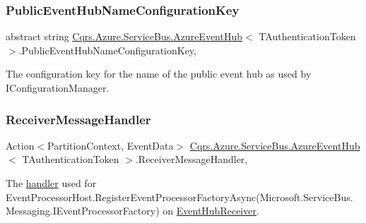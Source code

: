 \subsubsection{\texorpdfstring{Public\+Event\+Hub\+Name\+Configuration\+Key}{PublicEventHubNameConfigurationKey}}
{\footnotesize\ttfamily abstract string \hyperlink{classCqrs_1_1Azure_1_1ServiceBus_1_1AzureEventHub}{Cqrs.\+Azure.\+Service\+Bus.\+Azure\+Event\+Hub}$<$ T\+Authentication\+Token $>$.Public\+Event\+Hub\+Name\+Configuration\+Key\hspace{0.3cm}{\ttfamily [get]}, {\ttfamily [protected]}}



The configuration key for the name of the public event hub as used by I\+Configuration\+Manager. 

\mbox{\label{classCqrs_1_1Azure_1_1ServiceBus_1_1AzureEventHub_a8c9faa7096d72a45803e6e63a1b3cf30_a8c9faa7096d72a45803e6e63a1b3cf30}} 
\subsubsection{\texorpdfstring{Receiver\+Message\+Handler}{ReceiverMessageHandler}}
{\footnotesize\ttfamily Action$<$Partition\+Context, Event\+Data$>$ \hyperlink{classCqrs_1_1Azure_1_1ServiceBus_1_1AzureEventHub}{Cqrs.\+Azure.\+Service\+Bus.\+Azure\+Event\+Hub}$<$ T\+Authentication\+Token $>$.Receiver\+Message\+Handler\hspace{0.3cm}{\ttfamily [get]}, {\ttfamily [protected]}}



The \hyperlink{}{handler} used for Event\+Processor\+Host.\+Register\+Event\+Processor\+Factory\+Async(\+Microsoft.\+Service\+Bus.\+Messaging.\+I\+Event\+Processor\+Factory) on \hyperlink{classCqrs_1_1Azure_1_1ServiceBus_1_1AzureEventHub_a1b12b47dbb9b9afe2014477a2e457c35_a1b12b47dbb9b9afe2014477a2e457c35}{Event\+Hub\+Receiver}. 

\mbox{\label{classCqrs_1_1Azure_1_1ServiceBus_1_1AzureEventHub_ad3a0c2f32d5771fb1f4420fc33c75968_ad3a0c2f32d5771fb1f4420fc33c75968}} 
